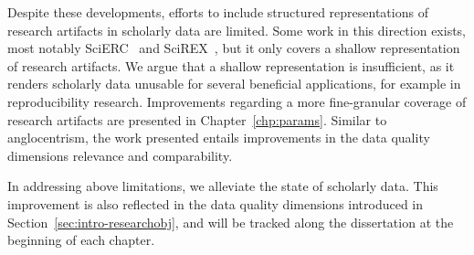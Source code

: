 \begin{enumerate}
Despite these developments, efforts to include structured representations of research artifacts in scholarly data are limited. Some work in this direction exists, most notably SciERC~\cite{luan2018scierc} and SciREX~\cite{Jain2020scirex}, but it only covers a shallow representation of research artifacts.
We argue that a shallow representation is insufficient, as it renders scholarly data unusable for several beneficial applications, for example in reproducibility research.
Improvements regarding a more fine-granular coverage of research artifacts are presented in Chapter~\ref{chp:params}. Similar to anglocentrism, the work presented entails improvements in the data quality dimensions relevance and comparability.
\end{enumerate}

In addressing above limitations, we alleviate the state of scholarly data. This improvement is also reflected in the data quality dimensions introduced in Section~\ref{sec:intro-researchobj}, and will be tracked along the dissertation at the beginning of each chapter.











